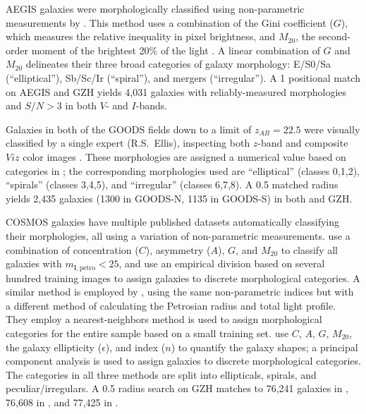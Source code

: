 \documentclass[twocolumn]{aastex6}
\begin{document}
AEGIS galaxies were morphologically classified using non-parametric measurements by \citet{lot08}. This method uses a combination of the Gini coefficient ($G$), which measures the relative inequality in pixel brightness, and $M_{20}$, the second-order moment of the brightest 20\% of the light \citep{lot04}. A linear combination of $G$ and $M_{20}$ delineates their three broad categories of galaxy morphology: E/S0/Sa (``elliptical''), Sb/Sc/Ir (``spiral''), and mergers (``irregular''). A 1\arcsec{} positional match on AEGIS and GZH yields 4,031 galaxies with reliably-measured morphologies and $S/N>3$ in both $V$- and $I$-bands. 

Galaxies in both of the GOODS fields down to a limit of $z_{AB}=22.5$ were visually classified by a single expert (R.S.~Ellis), inspecting both $z$-band and composite $Viz$ color images \citep{bun05}. These morphologies are assigned a numerical value based on categories in \citet{bri98a}; the corresponding morphologies used are ``elliptical'' (classes 0,1,2), ``spirals'' (classes 3,4,5), and ``irregular'' (classes 6,7,8). A 0.5\arcsec{} matched radius yields 2,435 galaxies (1300 in GOODS-N, 1135 in GOODS-S) in both \citet{bun05} and GZH.  

COSMOS galaxies have multiple published datasets automatically classifying their morphologies, all using a variation of non-parametric measurements. \citet{cas07} use a combination of concentration ($C$), asymmetry ($A$), $G$, and $M_{20}$ \citep{cas05} to classify all galaxies with $m_\mathrm{I,petro}<25$, and use an empirical division based on several hundred training images to assign galaxies to discrete morphological categories. A similar method is employed by \citet{tas11}, using the same non-parametric indices but with a different method of calculating the Petrosian radius and total light profile. They employ a nearest-neighbors method is used to assign morphological categories for the entire sample based on a small training set. \citet[][ZEST]{sca07} use $C$, $A$, $G$, $M_{20}$, the galaxy ellipticity ($\epsilon$), and \sersic{} index ($n$) to quantify the galaxy shapes; a principal component analysis is used to assign galaxies to discrete morphological categories. The categories in all three methods are split into ellipticals, spirals, and peculiar/irregulars. A 0.5\arcsec{} radius search on GZH matches to 76,241 galaxies in \citet{cas07}, 76,608 in \citet{tas11}, and 77,425 in \citet{sca07}.
\end{document}
